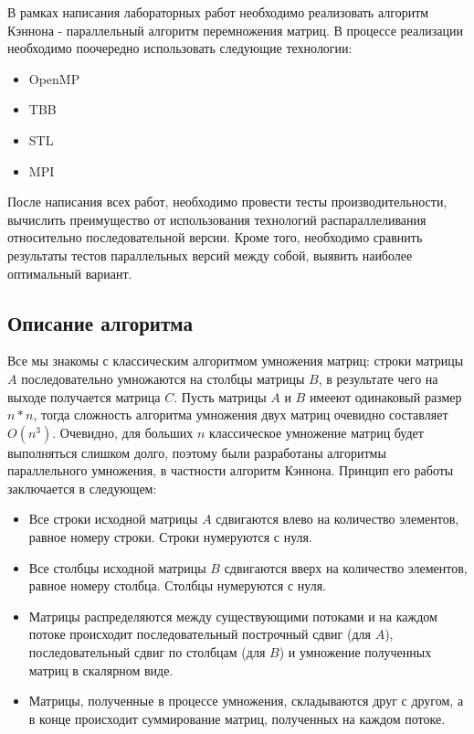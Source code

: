 \documentclass[12pt]{article}
\begin{document}
В рамках написания лабораторных работ необходимо реализовать алгоритм Кэннона - параллельный алгоритм перемножения матриц. В процессе реализации необходимо поочередно использовать следующие технологии: \\
\begin{itemize}
    \item OpenMP
    \item TBB
    \item STL
    \item MPI
\end{itemize}

После написания всех работ, необходимо провести тесты производительности, вычислить преимущество от использования технологий распараллеливания относительно последовательной версии. Кроме того, необходимо сравнить результаты тестов параллельных версий между собой, выявить наиболее оптимальный вариант.
\newpage
\begin{center}
    \section{Описание алгоритма}
\end{center}
Все мы знакомы с классическим алгоритмом умножения матриц: строки матрицы $A$ последовательно умножаются на столбцы матрицы $B$, в результате чего на выходе получается матрица $C$. Пусть матрицы $A$ и $B$ имееют одинаковый размер $n*n$, тогда сложность алгоритма умножения двух матриц очевидно составляет $O(n^3)$. Очевидно, для больших $n$ классическое умножение матриц будет выполняться слишком долго, поэтому были разработаны алгоритмы параллельного умножения, в частности алгоритм Кэннона. Принцип его работы заключается в следующем: \\
\begin{itemize}
    \item Все строки исходной матрицы $A$ сдвигаются влево на количество элементов, равное номеру строки. Строки нумеруются с нуля.
    \item Все столбцы исходной матрицы $B$ сдвигаются вверх на количество элементов, равное номеру столбца. Столбцы нумеруются с нуля.
    \item Матрицы распределяются между существующими потоками и на каждом потоке происходит последовательный построчный сдвиг (для $A$), последовательный сдвиг по столбцам (для $B$) и умножение полученных матриц в скалярном виде.
    \item Матрицы, полученные в процессе умножения, складываются друг с другом, а в конце происходит суммирование матриц, полученных на каждом потоке.
\end{itemize} 
\end{document}
